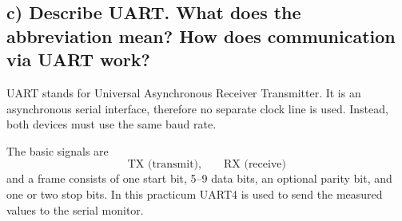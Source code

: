 \subsection{c) Describe UART. What does the abbreviation mean? How does communication via UART work?}

UART stands for Universal Asynchronous Receiver Transmitter. It is an asynchronous serial interface, therefore no separate clock line is used. Instead, both devices must use the same baud rate.

The basic signals are
\[
	\text{TX (transmit)}, \qquad \text{RX (receive)}
\]
and a frame consists of one start bit, 5--9 data bits, an optional parity bit, and one or two stop bits. In this practicum UART4 is used to send the measured values to the serial monitor.
